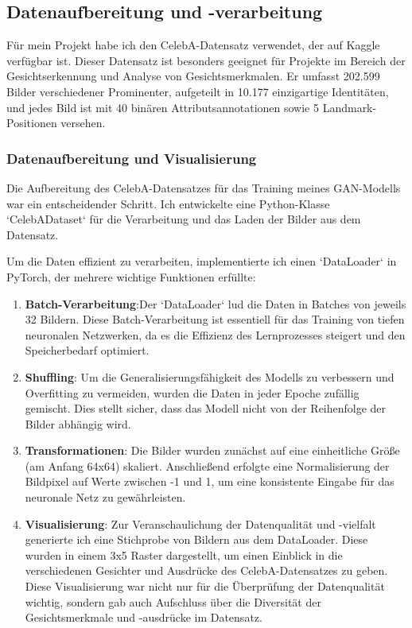 \documentclass[a4paper, 12pt]{article}
\begin{document}
\subsection{Datenaufbereitung und -verarbeitung}

Für mein Projekt habe ich den CelebA-Datensatz verwendet, der auf Kaggle verfügbar ist. Dieser Datensatz ist besonders geeignet für Projekte im Bereich der Gesichtserkennung und Analyse von Gesichtsmerkmalen. Er umfasst 202.599 Bilder verschiedener Prominenter, aufgeteilt in 10.177 einzigartige Identitäten, und jedes Bild ist mit 40 binären Attributsannotationen sowie 5 Landmark-Positionen versehen.

\subsubsection{Datenaufbereitung und Visualisierung}
Die Aufbereitung des CelebA-Datensatzes für das Training meines GAN-Modells war ein entscheidender Schritt. Ich entwickelte eine Python-Klasse `CelebADataset` für die Verarbeitung und das Laden der Bilder aus dem Datensatz.

Um die Daten effizient zu verarbeiten, implementierte ich einen `DataLoader` in PyTorch, der mehrere wichtige Funktionen erfüllte:


\begin{enumerate}
 \item \textbf{Batch-Verarbeitung}:Der `DataLoader` lud die Daten in Batches von jeweils 32 Bildern. Diese Batch-Verarbeitung ist essentiell für das Training von tiefen neuronalen Netzwerken, da es die Effizienz des Lernprozesses steigert und den Speicherbedarf optimiert.

 \item \textbf{Shuffling}: Um die Generalisierungsfähigkeit des Modells zu verbessern und Overfitting zu vermeiden, wurden die Daten in jeder Epoche zufällig gemischt. Dies stellt sicher, dass das Modell nicht von der Reihenfolge der Bilder abhängig wird.

 \item \textbf{Transformationen}: Die Bilder wurden zunächst auf eine einheitliche Größe (am Anfang 64x64) skaliert. Anschließend erfolgte eine Normalisierung der Bildpixel auf Werte zwischen -1 und 1, um eine konsistente Eingabe für das neuronale Netz zu gewährleisten.

 \item \textbf{Visualisierung}: Zur Veranschaulichung der Datenqualität und -vielfalt generierte ich eine Stichprobe von Bildern aus dem DataLoader. Diese wurden in einem 3x5 Raster dargestellt, um einen Einblick in die verschiedenen Gesichter und Ausdrücke des CelebA-Datensatzes zu geben. Diese Visualisierung war nicht nur für die Überprüfung der Datenqualität wichtig, sondern gab auch Aufschluss über die Diversität der Gesichtsmerkmale und -ausdrücke im Datensatz.
\end{enumerate}
\end{document}
